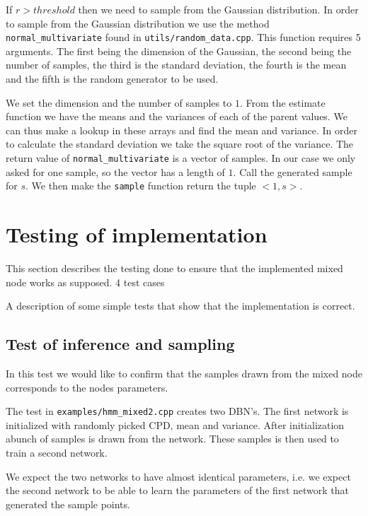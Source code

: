 \documentclass[10pt, journal, compsocconf,a4paper]{IEEEtran}
\begin{document}
If $r > threshold$ then we need to sample from the Gaussian distribution. In order to sample from the Gaussian distribution we use the method \texttt{normal\_multivariate} found in \texttt{utils/random\_data.cpp}. This function requires 5 arguments. The first being the dimension of the Gaussian, the second being the number of samples, the third is the standard deviation, the fourth is the mean and the fifth is the random generator to be used. 

We set the dimension and the number of samples to $1$. From the estimate function we have the means and the variances of each of the parent values. We can thus make a lookup in these arrays and find the mean and variance. In order to calculate the standard deviation we take the square root of the variance. The return value of \texttt{normal\_multivariate} is a vector of samples. In our case we only asked for one sample, so the vector has a length of $1$. Call the generated sample for $s$. We then make the \texttt{sample} function return the tuple $<1, s>$.




\section{Testing of implementation} %
\label{sec:testing_of_implementation}

This section describes the testing done to ensure that the implemented mixed node works as supposed. 4 test cases 

A description of some simple tests that show that the implementation is correct. 

\subsection{Test of inference and sampling} %
\label{sub:test_of_sampling}
In this test we would like to confirm that the samples drawn from the mixed node corresponds to the nodes parameters.

The test in \texttt{examples/hmm\_mixed2.cpp} creates two DBN's. The first network is initialized with randomly picked CPD, mean and variance. After initialization abunch of samples is drawn from the network. These samples is then used to train a second network. 

We expect the two networks to have almost identical parameters, i.e. we expect the second network to be able to learn the parameters of the first network that generated the sample points.
\end{document}
